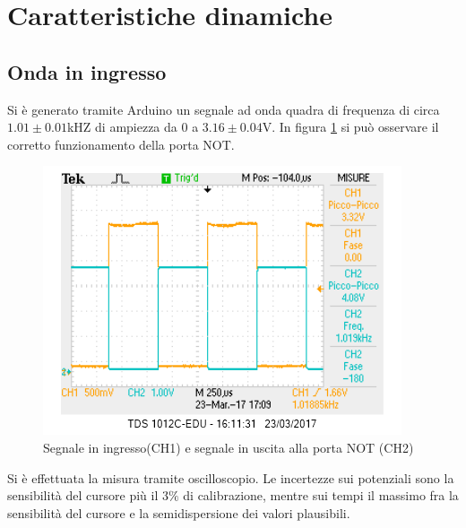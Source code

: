 \documentclass[10pt,a4paper]{article}
\begin{document}
\section{Caratteristiche dinamiche}
\subsection{Onda in ingresso}
Si è generato tramite Arduino un segnale ad onda quadra di frequenza di circa $1.01\pm0.01$kHZ di ampiezza da 0 a $3.16\pm 0.04$V.
In figura \ref{fig:ondanot} si può osservare il corretto funzionamento della porta NOT.
\begin{figure}[!htb]
\centering
\includegraphics[scale=0.7]{ondanot.png}
\caption{Segnale in ingresso(CH1) e segnale in uscita alla porta NOT (CH2)\label{fig:ondanot}}
\end{figure}
Si è effettuata la misura tramite oscilloscopio. Le incertezze sui potenziali sono la sensibilità del cursore più il $3\%$ di calibrazione, mentre sui tempi il massimo fra la sensibilità del cursore e la semidispersione dei valori plausibili.
\end{document}
